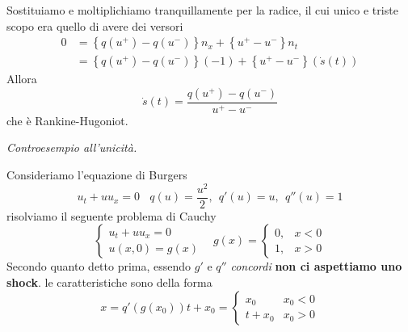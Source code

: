 \begin{dimostrazione}
\begin{equation*}
    \end{equation*}
    Sostituiamo e moltiplichiamo tranquillamente per la radice, il cui unico e triste scopo era quello di avere dei versori
    \begin{align*}
        0 & =\left\{q\left(u^{+}\right) -q\left(u^{-}\right)\right\} n_{x} +\left\{u^{+} -u^{-}\right\} n_{t}     \\
          & =\left\{q\left(u^{+}\right) -q\left(u^{-}\right)\right\}(-1) +\left\{u^{+} -u^{-}\right\}(\dot{s}(t))
    \end{align*}
    Allora
    \begin{equation*}
        \dot{s}(t) =\frac{q\left(u^{+}\right) -q\left(u^{-}\right)}{u^{+} -u^{-}}
    \end{equation*}
    che è Rankine-Hugoniot.
\end{dimostrazione}

\textit{Controesempio all'unicità.}

Consideriamo l'equazione di Burgers
\begin{equation}
    u_{t} +uu_{x} =0\ \ \ \ q(u) =\frac{u^{2}}{2} ,\ \ q'(u) =u,\ \ q''(u) =1
\end{equation}
risolviamo il seguente problema di Cauchy
\begin{equation*}
    \begin{cases}
        u_{t} +uu_{x} =0 \\
        u(x,0) =g(x)
    \end{cases} \ \ \ \ g(x) =
    \begin{cases}
        0, & x< 0 \\
        1, & x >0
    \end{cases}
\end{equation*}
Secondo quanto detto prima, essendo $g'$ e $q''$ \emph{concordi} \textbf{non ci aspettiamo uno shock}.
le caratteristiche sono della forma
\begin{equation*}
    x=q'(g(x_{0})) t+x_{0} =
    \begin{cases}
        x_{0}   & x_{0} < 0 \\
        t+x_{0} & x_{0}  >0
    \end{cases}
\end{equation*}


